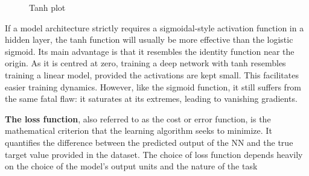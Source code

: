\begin{itemize}
	\begin{figure} [ht]
		\centering
		\caption{Tanh plot}
		\label{fig:TanhFunction}
	\end{figure}
	If a model architecture strictly requires a sigmoidal-style activation function in a hidden layer, the tanh function will usually be more effective than the logistic sigmoid. Its main advantage is that it resembles the identity function near the origin. As it is centred at zero, training a deep network with tanh resembles training a linear model, provided the activations are kept small. This facilitates easier training dynamics. However, like the sigmoid function, it still suffers from the same fatal flaw: it saturates at its extremes, leading to vanishing gradients.
\end{itemize}
\textbf{The loss function}, also referred to as the cost or error function, is the mathematical criterion that the learning algorithm seeks to minimize. It quantifies the difference between the predicted output of the NN and the true target value provided in the dataset. The choice of loss function depends heavily on the choice of the model's output units and the nature of the task
